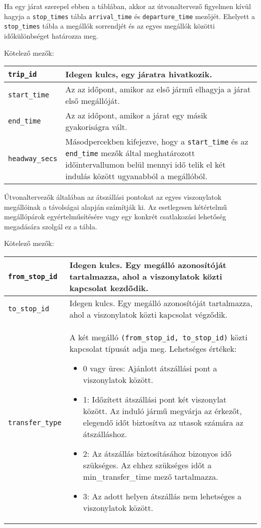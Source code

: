 
Ha egy járat szerepel ebben a táblában, akkor az útvonaltervező figyelmen kívül hagyja a \texttt{stop\_times} tábla \texttt{arrival\_time} és \texttt{departure\_time} mezőjét. Ehelyett a  \texttt{stop\_\-times} tábla a megállók sorrendjét és az egyes megállók közötti időkülönbséget határozza meg.

\medskip

\noindent Kötelező mezők:

\bigskip

\begin{tabular}{|p{3cm}|p{10cm}|}
\hline
\texttt{trip\_id} & Idegen kulcs, egy járatra hivatkozik. \\
\hline
\texttt{start\_time} & Az az időpont, amikor az első jármű elhagyja a járat első megállóját. \\
\hline
\texttt{end\_time} & Az az időpont, amikor a járat egy másik gyakoriságra vált. \\
\hline
\texttt{headway\_secs} & Másodpercekben kifejezve, hogy a \texttt{start\_time} és az \texttt{end\_time} mezők által meghatározott időintervallumon belül mennyi idő telik el két indulás között ugyanabból a megállóból. \\
\hline
\end{tabular}


Útvonaltervezők általában az átszállási pontokat az egyes viszonylatok megállóinak a távolságai alapján számítják ki. Az esetlegesen kétértelmű megállópárok egyértelműsítésére vagy egy konkrét csatlakozási lehetőség megadására szolgál ez a tábla.

\newpage

\noindent Kötelező mezők:

\bigskip

\begin{tabular}{|p{3cm}|p{10cm}|}
\hline
\texttt{from\_stop\_id} & Idegen kulcs. Egy megálló azonosítóját tartalmazza, ahol a viszonylatok közti kapcsolat kezdődik.  \\
\hline
\texttt{to\_stop\_id} & Idegen kulcs. Egy megálló azonosítóját tartalmazza, ahol a viszonylatok közti kapcsolat végződik. \\
\hline
\texttt{transfer\_type} & A két megálló \texttt{(from\_stop\_id, to\_stop\_id)} közti kapcsolat típusát adja meg.
Lehetséges értékek:
\begin{itemize}
\item 0 vagy üres: Ajánlott átszállási pont a viszonylatok között.
\item 1: Időzített átszállási pont két viszonylat között. Az induló jármű megvárja az érkezőt, elegendő időt biztosítva az utasok számára az átszálláshoz.
\item 2: Az átszállás biztosításához bizonyos idő szükséges. Az ehhez szükséges időt a min\_transfer\_time mező tartalmazza.
\item 3: Az adott helyen átszállás nem lehetséges a viszonylatok között.
\end{itemize}
\\
\hline
\end{tabular}

